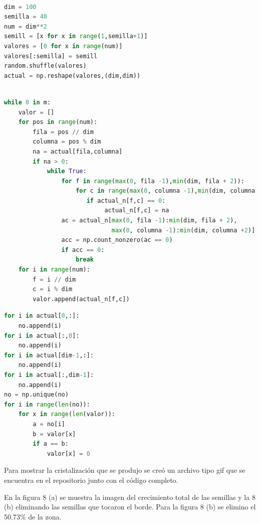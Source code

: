 \documentclass{article}
\begin{document}
\begin{lstlisting}[language=Python, caption= Código para creación y posicionamiento de semillas.]

dim = 100
semilla = 40
num = dim**2
semill = [x for x in range(1,semilla+1)]
valores = [0 for x in range(num)]
valores[:semilla] = semill
random.shuffle(valores)
actual = np.reshape(valores,(dim,dim))
\end{lstlisting}
\newpage
\begin{lstlisting}[language=Python, caption= Código para expansión de semillas.]

while 0 in m:
    valor = []
    for pos in range(num):
        fila = pos // dim
        columna = pos % dim
        na = actual[fila,columna]
        if na > 0:
            while True:    
                for f in range(max(0, fila -1),min(dim, fila + 2)):
                    for c in range(max(0, columna -1),min(dim, columna +2)):
                       if actual_n[f,c] == 0:
                            actual_n[f,c] = na
                ac = actual_n[max(0, fila -1):min(dim, fila + 2),
                              max(0, columna -1):min(dim, columna +2)].ravel()
                acc = np.count_nonzero(ac == 0)
                if acc == 0:
                    break
    for i in range(num):
        f = i // dim
        c = i % dim
        valor.append(actual_n[f,c])
\end{lstlisting}

\begin{lstlisting}[language=Python, caption= Código para eliminar la orilla]
for i in actual[0,:]:
    no.append(i)
for i in actual[:,0]:
    no.append(i)
for i in actual[dim-1,:]:
    no.append(i)
for i in actual[:,dim-1]:
    no.append(i)
no = np.unique(no)
for i in range(len(no)):
    for x in range(len(valor)):
        a = no[i]
        b = valor[x]
        if a == b:
            valor[x] = 0
\end{lstlisting}

Para mostrar la cristalización que se produjo se creó un archivo tipo gif que se encuentra en el repositorio junto con el código completo\cite{Denisse_Leyva}.

En la figura 8 (a) se muestra la imagen del crecimiento total de las semillas y la 8 (b) eliminando las semillas que tocaron el borde.
Para la figura 8 (b) se elimino el 50.73\% de la zona. 
\end{document}
